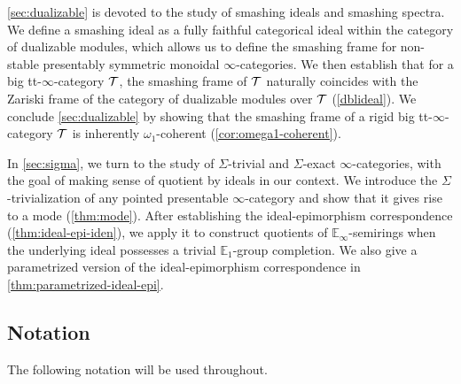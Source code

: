 \documentclass[10pt,a4paper,oneside]{article}
\begin{document}
\cref{sec:dualizable} is devoted to the study of smashing ideals and smashing spectra. We define a smashing ideal as a fully faithful categorical ideal within the category of dualizable modules, which allows us to define the smashing frame for non-stable presentably symmetric monoidal $\infty$-categories. We then establish that for a big tt-$\infty$-category $\mathcal{T}$, the smashing frame of $\mathcal{T}$ naturally coincides with the Zariski frame of the category of dualizable modules over $\mathcal{T}$ (\cref{dblideal}). We conclude \cref{sec:dualizable} by showing that the smashing frame of a rigid big tt-$\infty$-category $\mathcal{T}$ is inherently $\omega_1$-coherent (\cref{cor:omega1-coherent}).

In \cref{sec:sigma}, we turn to the study of $\Sigma$-trivial and $\Sigma$-exact $\infty$-categories, with the goal of making sense of quotient by ideals in our context. We introduce the $\Sigma$-trivialization of any pointed presentable $\infty$-category and show that it gives rise to a mode (\cref{thm:mode}). After establishing the ideal-epimorphism correspondence (\cref{thm:ideal-epi-iden}), we apply it to construct quotients of $\mathbb{E}_\infty$-semirings when the underlying ideal possesses a trivial $\mathbb{E}_1$-group completion. We also give a parametrized version of the ideal-epimorphism correspondence in \cref{thm:parametrized-ideal-epi}.
\subsection*{Notation}

The following notation will be used throughout.
\end{document}
